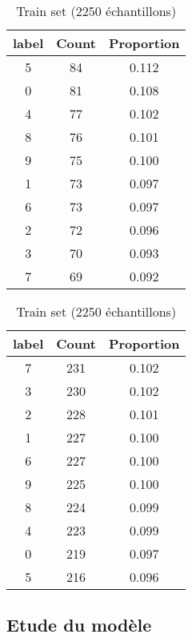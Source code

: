 \documentclass{article}
\begin{document}
\begin{table}[H]
    \centering
    \label{tab:data_distribution}
    \begin{minipage}{0.48\textwidth}
        \centering
        \caption{Test set (750 échantillons)}
        \begin{tabular}{|c|c|c|}
            \hline
            label & Count & Proportion \\
            \hline
            5 & 84 & 0.112 \\
            0 & 81 & 0.108 \\
            4 & 77 & 0.102 \\
            8 & 76 & 0.101 \\
            9 & 75 & 0.100 \\
            1 & 73 & 0.097 \\
            6 & 73 & 0.097 \\
            2 & 72 & 0.096 \\
            3 & 70 & 0.093 \\
            7 & 69 & 0.092 \\
            \hline
        \end{tabular}
    \end{minipage}\hfill
    \begin{minipage}{0.48\textwidth}
        \centering
        \caption{Train set (2250 échantillons)}
        \begin{tabular}{|c|c|c|}
            \hline
            label & Count & Proportion \\
            \hline
            7 & 231 & 0.102 \\
            3 & 230 & 0.102 \\
            2 & 228 & 0.101 \\
            1 & 227 & 0.100 \\
            6 & 227 & 0.100 \\
            9 & 225 & 0.100 \\
            8 & 224 & 0.099 \\
            4 & 223 & 0.099 \\
            0 & 219 & 0.097 \\
            5 & 216 & 0.096 \\
            \hline
        \end{tabular}
    \end{minipage}
\end{table}

\subsection{Etude du modèle}
\label{subsec:etude_model}
\end{document}
